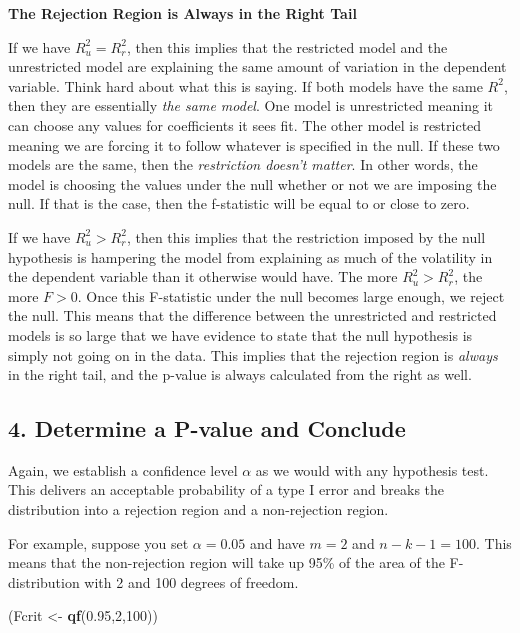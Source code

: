 \documentclass[
]{book}
\newenvironment{Shaded}{\begin{snugshade}}{\end{snugshade}}
\newcommand{\DecValTok}[1]{\textcolor[rgb]{0.00,0.00,0.81}{#1}}
\newcommand{\FloatTok}[1]{\textcolor[rgb]{0.00,0.00,0.81}{#1}}
\newcommand{\FunctionTok}[1]{\textcolor[rgb]{0.13,0.29,0.53}{\textbf{#1}}}
\newcommand{\NormalTok}[1]{#1}
\newcommand{\OtherTok}[1]{\textcolor[rgb]{0.56,0.35,0.01}{#1}}
\begin{document}
\textbf{The Rejection Region is Always in the Right Tail}

If we have \(R^2_u = R^2_r\), then this implies that the restricted model and the unrestricted model are explaining the same amount of variation in the dependent variable. Think hard about what this is saying. If both models have the same \(R^2\), then they are essentially \emph{the same model}. One model is unrestricted meaning it can choose any values for coefficients it sees fit. The other model is restricted meaning we are forcing it to follow whatever is specified in the null. If these two models are the same, then the \emph{restriction doesn't matter}. In other words, the model is choosing the values under the null whether or not we are imposing the null. If that is the case, then the f-statistic will be equal to or close to zero.

If we have \(R^2_u > R^2_r\), then this implies that the restriction imposed by the null hypothesis is hampering the model from explaining as much of the volatility in the dependent variable than it otherwise would have. The more \(R^2_u > R^2_r\), the more \(F>0\). Once this F-statistic under the null becomes large enough, we reject the null. This means that the difference between the unrestricted and restricted models is so large that we have evidence to state that the null hypothesis is simply not going on in the data. This implies that the rejection region is \emph{always} in the right tail, and the p-value is always calculated from the right as well.

\subsection*{4. Determine a P-value and Conclude}\label{determine-a-p-value-and-conclude}

Again, we establish a confidence level \(\alpha\) as we would with any hypothesis test. This delivers an acceptable probability of a type I error and breaks the distribution into a rejection region and a non-rejection region.

For example, suppose you set \(\alpha = 0.05\) and have \(m=2\) and \(n-k-1 = 100\). This means that the non-rejection region will take up 95\% of the area of the F-distribution with 2 and 100 degrees of freedom.

\begin{Shaded}
\begin{Highlighting}[]
\NormalTok{(Fcrit }\OtherTok{\textless{}{-}} \FunctionTok{qf}\NormalTok{(}\FloatTok{0.95}\NormalTok{,}\DecValTok{2}\NormalTok{,}\DecValTok{100}\NormalTok{))}
\end{Highlighting}
\end{Shaded}
\end{document}
